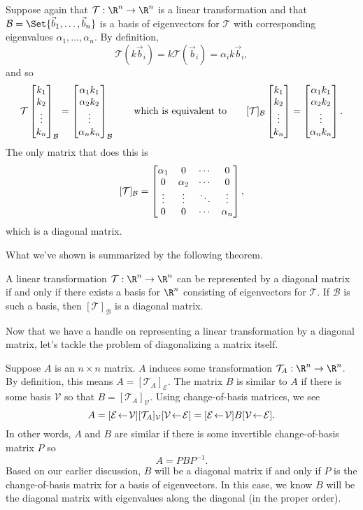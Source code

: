 Suppose again that $\mathcal T:\R^n\to\R^n$ is a linear transformation and that $\mathcal B=\Set{\vec b_1,\ldots,\vec b_n}$
is a basis of eigenvectors for $\mathcal T$ with corresponding eigenvalues $\alpha_1,\ldots,\alpha_n$. By definition,
\[
	\mathcal T(k\vec b_i)=k\mathcal T(\vec b_i)=\alpha_ik\vec b_i,
\]
and so
\[
	\mathcal T\begin{bmatrix}k_1\\k_2\\\vdots\\k_n\end{bmatrix}_{\mathcal B} = \begin{bmatrix}\alpha_1k_1\\\alpha_2k_2\\\vdots\\\alpha_nk_n\end{bmatrix}_{\mathcal B}
	\qquad\text{which is equivalent to}\qquad
	[\mathcal T]_{\mathcal B}\begin{bmatrix}k_1\\k_2\\\vdots\\k_n\end{bmatrix} = \begin{bmatrix}\alpha_1k_1\\\alpha_2k_2\\\vdots\\\alpha_nk_n\end{bmatrix}.
\]
The only matrix that does this is
\[
	[\mathcal T]_{\mathcal B} = \begin{bmatrix}\alpha_1&0&\cdots &0\\0&\alpha_2&\cdots &0\\\vdots&\vdots&\ddots&\vdots\\0&0&\cdots&\alpha_n\end{bmatrix},
\]
which is a diagonal matrix.

What we've shown is summarized by the following theorem.
\begin{theorem}
	A linear transformation $\mathcal T:\R^n\to\R^n$ can be represented by a diagonal matrix if and
	only if there exists a basis for $\R^n$ consisting of eigenvectors for $\mathcal T$. If
	$\mathcal B$ is such a basis, then $[\mathcal T]_{\mathcal B}$ is a diagonal matrix.
\end{theorem}

Now that we have a handle on representing a linear transformation by a diagonal matrix, let's tackle
the problem of diagonalizing a matrix itself.


Suppose $A$ is an $n\times n$ matrix. $A$ induces some transformation $\mathcal T_A:\R^n\to\R^n$. By definition,
this means $A=[\mathcal T_A]_{\mathcal E}$. The matrix $B$ is similar to $A$ if there is some basis $\mathcal V$ so that
$B=[\mathcal T_A]_{\mathcal V}$. Using change-of-basis matrices, we see
\[
	A=\BasisChange{\mathcal V}{\mathcal E}[\mathcal T_A]_{\mathcal V}\BasisChange{\mathcal E}{\mathcal V}
	=\BasisChange{\mathcal V}{\mathcal E}B\BasisChange{\mathcal E}{\mathcal V}.
\]
In other words, $A$ and $B$ are similar if there is some invertible change-of-basis matrix $P$ so
\[
	A=PBP^{-1}.
\]
Based on our earlier discussion, $B$ will be a diagonal matrix if and only if $P$ is the change-of-basis matrix for a
basis of eigenvectors. In this case, we know $B$ will be the diagonal matrix with eigenvalues along the diagonal (in the proper order).


